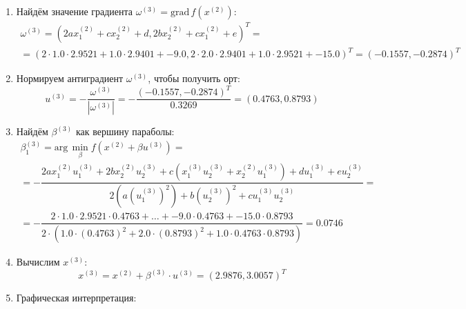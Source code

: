 \documentclass[12pt]{article}
\begin{document}
\begin{enumerate}
  \item Найдём значение градиента $\omega^{(3)}=\textrm{grad}\,f(x^{(2)})$:
  \[
  \begin{gathered}
    \omega^{(3)}=(2ax_1^{(2)}+cx_2^{(2)}+d,2bx_2^{(2)}+cx_1^{(2)}+e)^T=\\
    =(2\cdot 1.0\cdot 2.9521+1.0\cdot 2.9401+-9.0, 2\cdot 2.0\cdot 2.9401+1.0\cdot 2.9521+-15.0)^T=(-0.1557, -0.2874)^T
  \end{gathered}
  \]

  \item Нормируем антиградиент \( \omega^{(3)} \), чтобы получить орт:
  \[
    u^{(3)}=-\dfrac{\omega^{(3)}}{|\omega^{(3)}|}=-\dfrac{(-0.1557, -0.2874)^T}{0.3269}=(0.4763,0.8793)
  \]

  \item Найдём \( \beta^{(3)} \) как вершину параболы:
  \[
  \begin{gathered}
    \beta^{(3)}_1=\textrm{arg}\,\min_{\beta}f(x^{(2)}+\beta u^{(3)})=\\
    =-\dfrac{2ax^{(2)}_1u_1^{(3)}+2bx_2^{(2)}u_2^{(3)}+c(x_1^{(3)}u_2^{(3)}+x^{(2)}_2u_1^{(3)})+du_1^{(3)}+eu_2^{(3)}}{2(a(u_1^{(3)})^2)+b(u_2^{(3)})^2+cu_1^{(3)}u_2^{(3)}}=\\
    =-\dfrac{2\cdot 1.0\cdot 2.9521\cdot 0.4763+\dots+-9.0\cdot 0.4763+-15.0\cdot 0.8793}{2\cdot (1.0\cdot(0.4763)^2+2.0\cdot (0.8793)^2+1.0\cdot 0.4763\cdot 0.8793)}=0.0746
  \end{gathered}
  \]

  \item Вычислим \( x^{(3)} \):
  \[
    x^{(3)}=x^{(2)}+\beta^{(3)}\cdot u^{(3)}=(2.9876,3.0057)^T
  \]

  \item Графическая интерпретация:
  \begin{figure}[H]
  \centering
\end{figure}
\end{enumerate}
\end{document}
